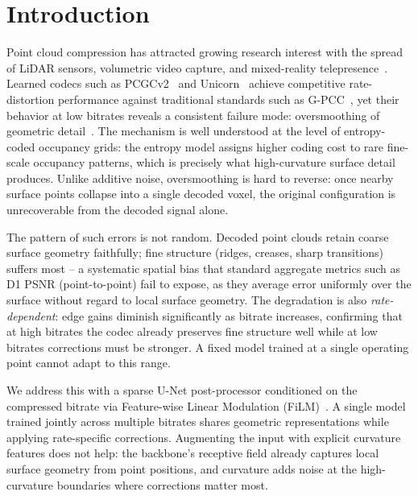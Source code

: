 \documentclass[conference]{IEEEtran}
\begin{document}
\section{Introduction}
\label{sec:intro}

Point cloud compression has attracted growing research interest with the spread
of LiDAR sensors, volumetric video capture, and mixed-reality
telepresence~\cite{schwarz2018emerging}. Learned codecs such
as PCGCv2~\cite{wang2021multiscale} and Unicorn~\cite{wang2025unicorn} achieve competitive rate-distortion performance against traditional
standards such as G-PCC~\cite{graziosi2020gpcc}, yet their behavior at low
bitrates reveals a consistent failure mode: oversmoothing of geometric detail~\cite{he2022density}.
The mechanism is well understood at the level of entropy-coded occupancy grids:
the entropy model assigns higher coding cost to rare fine-scale occupancy
patterns, which is precisely what high-curvature surface detail produces.
Unlike additive noise, oversmoothing is hard to reverse: once nearby surface
points collapse into a single decoded voxel, the original configuration is
unrecoverable from the decoded signal alone.

The pattern of such errors is not random. Decoded point clouds retain
coarse surface geometry faithfully; fine structure (ridges, creases, sharp
transitions) suffers most -- a systematic spatial bias that standard
aggregate metrics such as D1 PSNR (point-to-point) fail to expose,
as they average error uniformly over the surface without regard to local
surface geometry.
The degradation is also \emph{rate-dependent}: edge gains diminish
significantly as bitrate increases, confirming that at high bitrates the
codec already preserves fine structure well while at low bitrates corrections
must be stronger. A fixed model trained at a single operating point cannot
adapt to this range.

We address this with a sparse U-Net post-processor conditioned on the compressed
bitrate via Feature-wise Linear Modulation (FiLM)~\cite{perez2018film}. A
single model trained jointly across multiple bitrates shares geometric
representations while applying rate-specific corrections. Augmenting the input with explicit curvature features does not help: the
backbone's receptive field already captures local surface geometry from point
positions, and curvature adds noise at the high-curvature boundaries where
corrections matter most.
\end{document}
